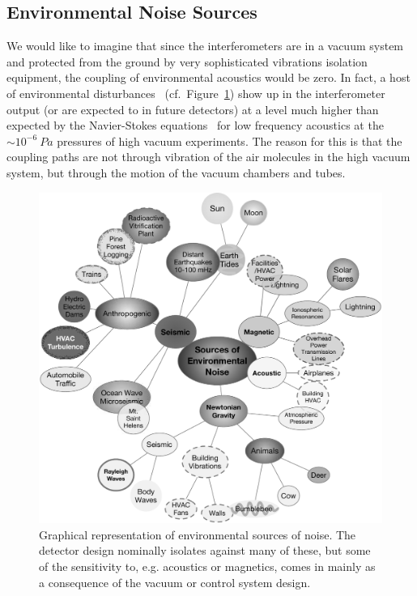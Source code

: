 \subsection{Environmental Noise Sources}
\label{s:IDC:PEM}
We would like to imagine that since the interferometers are in a vacuum system and
protected from the ground by very sophisticated vibrations isolation equipment,
the coupling of environmental acoustics would be zero. In fact, a host of environmental
disturbances~\cite{Effler:2015hw, Acernese:2006dq} (cf.~Figure~\ref{fig:EnvironmentalNoise})
show up in the interferometer output (or are expected to in future detectors)
at a level much higher than expected by the Navier-Stokes
equations~\cite{Greenspan:sound} for low frequency acoustics at the $\sim10^{-6}~Pa$
pressures of high vacuum experiments. The reason for this is that the coupling
paths are not through vibration of the air molecules in the high vacuum system,
but through the motion of the vacuum chambers and tubes.




\begin{figure}[t]
\centering
\includegraphics[width=\columnwidth]{Figures/Environmental-BW.pdf}
\caption{Graphical representation of environmental sources of noise. The detector
design nominally isolates against many of these, but some of the sensitivity to,
e.g. acoustics or magnetics, comes in mainly as a consequence of the vacuum
or control system design.}
\label{fig:EnvironmentalNoise}
\end{figure}

